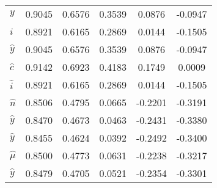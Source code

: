 \begin{center}
\begin{longtable}{lccccc}
${y}         $	 & 	    0.9045	 & 	    0.6576	 & 	    0.3539	 & 	    0.0876	 & 	   -0.0947 \\ 
${i}         $	 & 	    0.8921	 & 	    0.6165	 & 	    0.2869	 & 	    0.0144	 & 	   -0.1505 \\ 
${\hat y}    $	 & 	    0.9045	 & 	    0.6576	 & 	    0.3539	 & 	    0.0876	 & 	   -0.0947 \\ 
${\hat c}    $	 & 	    0.9142	 & 	    0.6923	 & 	    0.4183	 & 	    0.1749	 & 	    0.0009 \\ 
${\hat i}    $	 & 	    0.8921	 & 	    0.6165	 & 	    0.2869	 & 	    0.0144	 & 	   -0.1505 \\ 
${\hat n}    $	 & 	    0.8506	 & 	    0.4795	 & 	    0.0665	 & 	   -0.2201	 & 	   -0.3191 \\ 
${\hat y}    $	 & 	    0.8470	 & 	    0.4673	 & 	    0.0463	 & 	   -0.2431	 & 	   -0.3380 \\ 
${\hat y}    $	 & 	    0.8455	 & 	    0.4624	 & 	    0.0392	 & 	   -0.2492	 & 	   -0.3400 \\ 
${\hat \mu}  $	 & 	    0.8500	 & 	    0.4773	 & 	    0.0631	 & 	   -0.2238	 & 	   -0.3217 \\ 
${\hat y}    $	 & 	    0.8479	 & 	    0.4705	 & 	    0.0521	 & 	   -0.2354	 & 	   -0.3301 \\ 
\end{longtable}
 \end{center}
